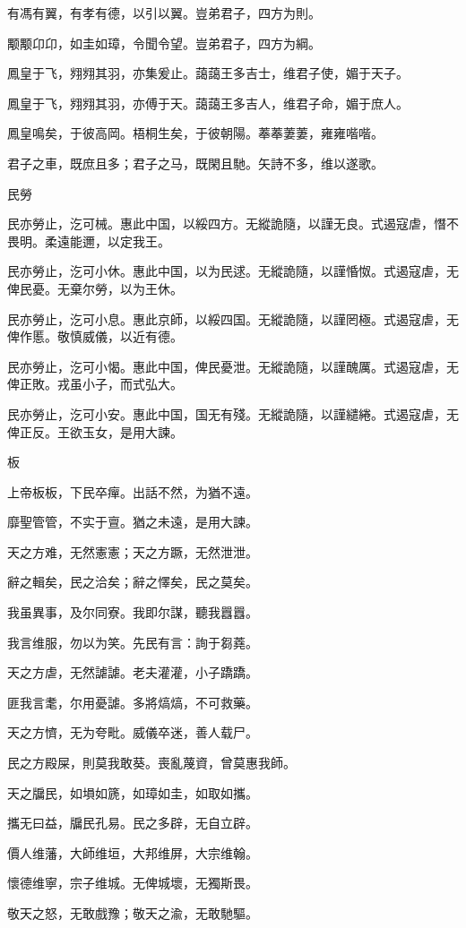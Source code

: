 有馮有翼，有孝有德，以引以翼。豈弟君子，四方为則。

颙颙卬卬，如圭如璋，令聞令望。豈弟君子，四方为綱。

鳳皇于飞，翙翙其羽，亦集爰止。藹藹王多吉士，维君子使，媚于天子。

鳳皇于飞，翙翙其羽，亦傅于天。藹藹王多吉人，维君子命，媚于庶人。

鳳皇鳴矣，于彼高岡。梧桐生矣，于彼朝陽。菶菶萋萋，雍雍喈喈。

君子之車，既庶且多；君子之马，既閑且馳。矢詩不多，维以遂歌。

民勞

民亦勞止，汔可械。惠此中国，以綏四方。无縱詭隨，以謹无良。式遏寇虐，憯不畏明。柔遠能邇，以定我王。

民亦勞止，汔可小休。惠此中国，以为民逑。无縱詭隨，以謹惛怓。式遏寇虐，无俾民憂。无棄尔勞，以为王休。

民亦勞止，汔可小息。惠此京師，以綏四国。无縱詭隨，以謹罔極。式遏寇虐，无俾作慝。敬慎威儀，以近有德。

民亦勞止，汔可小愒。惠此中国，俾民憂泄。无縱詭隨，以謹醜厲。式遏寇虐，无俾正敗。戎虽小子，而式弘大。

民亦勞止，汔可小安。惠此中国，国无有殘。无縱詭隨，以謹繾綣。式遏寇虐，无俾正反。王欲玉女，是用大諫。

板

上帝板板，下民卒癉。出話不然，为猶不遠。

靡聖管管，不实于亶。猶之未遠，是用大諫。

天之方难，无然憲憲；天之方蹶，无然泄泄。

辭之輯矣，民之洽矣；辭之懌矣，民之莫矣。

我虽異事，及尔同寮。我即尔謀，聽我囂囂。

我言维服，勿以为笑。先民有言：詢于芻蕘。

天之方虐，无然謔謔。老夫灌灌，小子蹻蹻。

匪我言耄，尔用憂謔。多將熇熇，不可救藥。

天之方懠，无为夸毗。威儀卒迷，善人载尸。

民之方殿屎，則莫我敢葵。喪亂蔑資，曾莫惠我師。

天之牖民，如塤如篪，如璋如圭，如取如攜。

攜无曰益，牖民孔易。民之多辟，无自立辟。

價人维藩，大師维垣，大邦维屏，大宗维翰。

懷德维寧，宗子维城。无俾城壞，无獨斯畏。

敬天之怒，无敢戲豫；敬天之渝，无敢馳驅。

